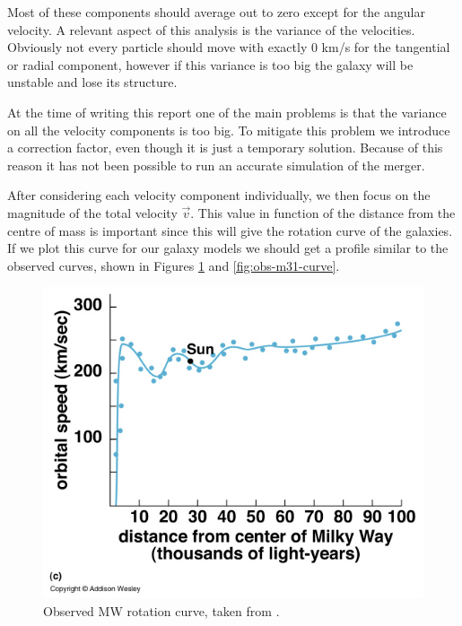 \documentclass[a4paper,12pt, english]{article}
\begin{document}
\smallskip
Most of these components should average out to zero except for the angular velocity. A relevant aspect of this analysis is the variance of the velocities. Obviously not every particle should move with exactly 0 km/s for the tangential or radial component, however if this variance is too big the galaxy will be unstable and lose its structure.\par
\smallskip
At the time of writing this report one of the main problems is that the variance on all the velocity components is too big. To mitigate this problem we introduce a correction factor, even though it is just a temporary solution. Because of this reason it has not been possible to run an accurate simulation of the merger.\par
\smallskip
After considering each velocity component individually, we then focus on the magnitude of the total velocity $\vec{v}$. This value in function of the distance from the centre of mass is important since this will give the rotation curve of the galaxies. If we plot this curve for our galaxy models we should get a profile similar to the observed curves, shown in Figures \ref{fig:obs-mw-curve} and \ref{fig:obs-m31-curve}.\par
\begin{figure}
    \centering
    \includegraphics[width=0.6\linewidth]{Rotation_Curve.jpg}
    \caption{Observed MW rotation curve, taken from \textcite{Obennet_2017}.}
    \label{fig:obs-mw-curve}
\end{figure}
\end{document}
